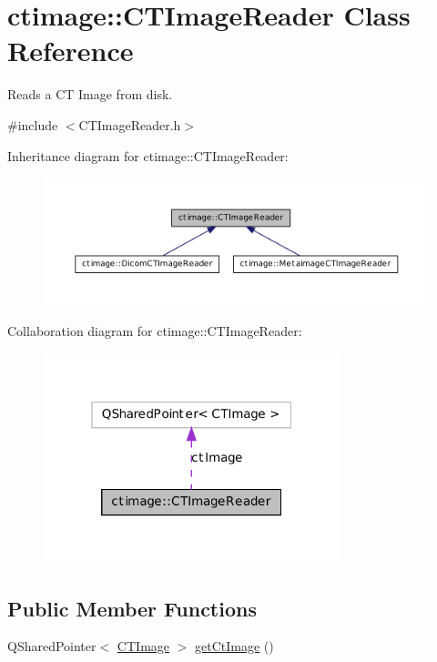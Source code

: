 \hypertarget{classctimage_1_1_c_t_image_reader}{
\section{ctimage::CTImageReader Class Reference}
\label{classctimage_1_1_c_t_image_reader}
}


Reads a CT Image from disk.  




{\ttfamily \#include $<$CTImageReader.h$>$}



Inheritance diagram for ctimage::CTImageReader:\nopagebreak
\begin{figure}[H]
\begin{center}
\leavevmode
\includegraphics[width=400pt]{classctimage_1_1_c_t_image_reader__inherit__graph}
\end{center}
\end{figure}


Collaboration diagram for ctimage::CTImageReader:\nopagebreak
\begin{figure}[H]
\begin{center}
\leavevmode
\includegraphics[width=244pt]{classctimage_1_1_c_t_image_reader__coll__graph}
\end{center}
\end{figure}
\subsection*{Public Member Functions}
\begin{DoxyCompactItemize}
\item 
QSharedPointer$<$ \hyperlink{classctimage_1_1_c_t_image}{CTImage} $>$ \hyperlink{classctimage_1_1_c_t_image_reader_a86ddbe900d2d0e7c4129dcd7380595dc}{getCtImage} ()
\end{DoxyCompactItemize}
